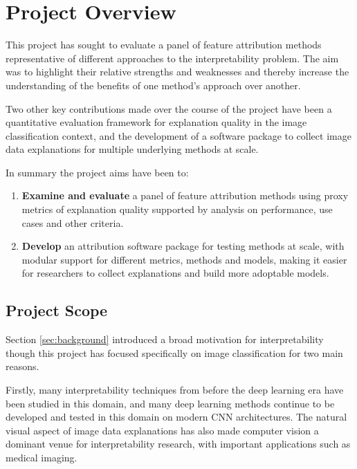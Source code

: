 \documentclass[main]{subfiles}
\begin{document}

\section{Project Overview}
This project has sought to evaluate a panel of feature attribution methods representative of different approaches to the interpretability problem. The aim was to highlight their relative strengths and weaknesses and thereby increase the understanding of the benefits of one method's approach over another.

Two other  key contributions made over the course of the project have been a quantitative evaluation framework for explanation quality in the image classification context, and the development of a software package to collect image data explanations for multiple underlying methods at scale.

In summary the project aims have been to:
\begin{enumerate}
	\item \textbf{Examine and evaluate} a panel of feature attribution methods using proxy metrics of explanation quality supported by analysis on performance, use cases and other criteria.

	\item \textbf{Develop} an attribution software package for testing methods at scale, with modular support for different metrics, methods and models, making it easier for researchers to collect explanations and build more adoptable models.
	
\end{enumerate}


\newpage

\subsection*{Project Scope} \label{sec:intro_scope}

Section \ref{sec:background} introduced a broad motivation for interpretability though this project has focused specifically on image classification for two main reasons.

Firstly, many interpretability techniques from before the deep learning era have been studied in this domain, and many deep learning methods continue to be developed and tested in this domain on modern CNN architectures. The natural visual aspect of image data explanations has also made computer vision a dominant venue for interpretability research, with important applications such as medical imaging.
 
\end{document}
